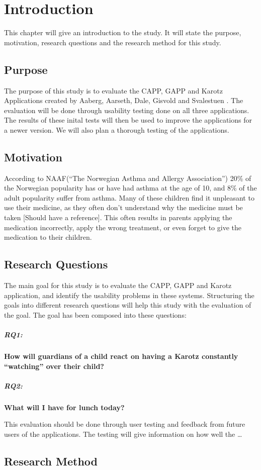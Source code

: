 \chapter{Introduction}
\label{introduction}

This chapter will give an introduction to the study. It will state the purpose, motivation, research questions and the research method for this study. 

\section{Purpose}
\label{purpose}
The purpose of this study is to evaluate the CAPP, GAPP and Karotz Applications created by Aaberg, Aarseth, Dale, Gisvold and Svalestuen \cite{CustomerDriven}.
The evaluation will be done through usability testing done on all three applications. The results of these inital tests will then be used to improve the applications for a newer version. 
We will also plan a thorough testing of the applications.


\section{Motivation}
\label{sec:motivation}
According to NAAF(``The Norwegian Asthma and Allergy Association'') 20\% of the Norwegian popularity has or have had asthma at the age of 10, and 8\% of the adult popularity suffer from asthma. Many of these children find it unpleasant to use their medicine, as they often don't understand why the medicine must be taken [Should have a reference]. This often results in parents applying the medication incorrectly, apply the wrong treatment, or even forget to give the medication to their children. 


\section{Research Questions}
\label{sec:reseachquestions}
The main goal for this study is to evaluate the CAPP, GAPP and Karotz application, and identify the usability problems in these systems. Structuring the goals into different research questions will help this study with the evaluation of the goal. The goal has been composed into these questions:

\paragraph{RQ1:}
\textbf{How will guardians of a child react on having a Karotz constantly ``watching'' over their child?}


\paragraph{RQ2:}
\textbf{What will I have for lunch today?}

This evaluation should be done through user testing and feedback from future users of the applications. The testing will give information on how well the 
\ldots

\section{Research Method}
\label{researchmethod}


